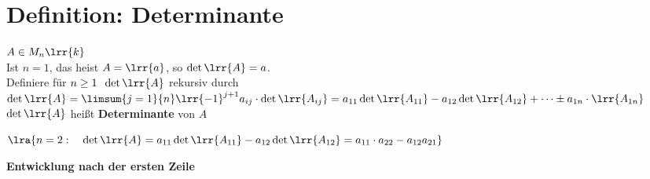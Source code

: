 \section{Definition: Determinante}
	$A\in M_n\lrr{k}$\\
	Ist $n=1$, das heist $A=\lrr{a}$, so $\det\lrr{A}=a$.\\
	Definiere für $n\geq 1 \;\; \det\lrr{A}$ rekursiv durch\\
  $\det\lrr{A}=\limsum{j=1}{n}\lrr{-1}^{j+1}a_{ij}\cdot\det\lrr{A_{ij}}=a_{11}\det\lrr{A_{11}}-a_{12}\det\lrr{A_{12}}+\dots\pm
  a_{1n}\cdot\lrr{A_{1n}}$\\
	$\det\lrr{A}$ heißt \textbf{Determinante} von $A$

	$\lra{n=2:\quad \det\lrr{A}=a_{11}\det\lrr{A_{11}}-a_{12}\det\lrr{A_{12}}=a_{11}\cdot a_{22}-a_{12}a_{21}}$

	\textbf{Entwicklung nach der ersten Zeile}

